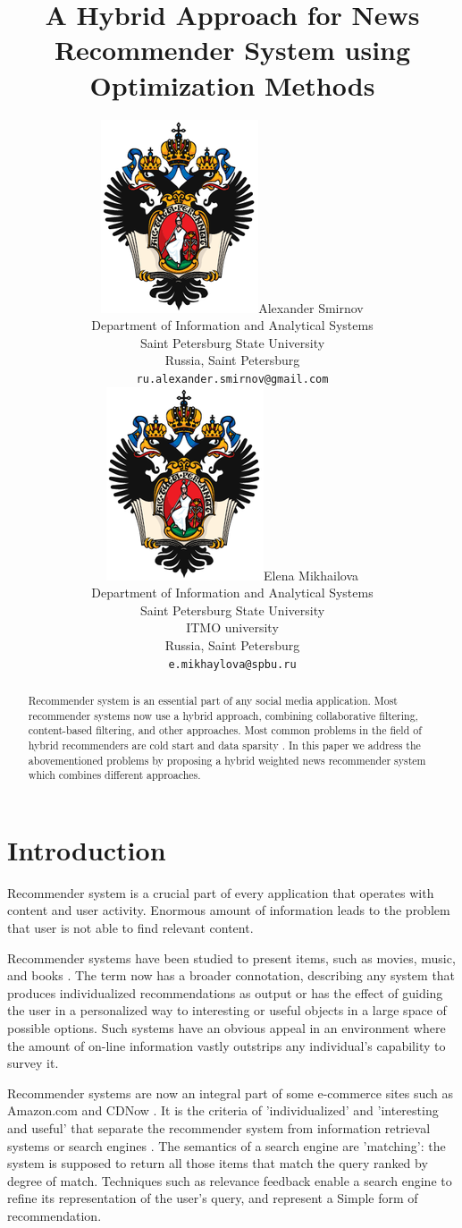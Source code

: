 \documentclass{article}
\title{A Hybrid Approach for News Recommender System using Optimization Methods}
\author{
    {\includegraphics[scale=0.07]{./images/spbu.png}\hspace{1mm}Alexander Smirnov}\\
	Department of Information and Analytical Systems\\
	Saint Petersburg State University\\
	Russia, Saint Petersburg\\
	\texttt{ru.alexander.smirnov@gmail.com} \\
	\And
	{\includegraphics[scale=0.07]{images/spbu.png}\hspace{1mm}Elena Mikhailova} \\
	Department of Information and Analytical Systems\\
	Saint Petersburg State University\\
    ITMO university\\
	Russia, Saint Petersburg\\
	\texttt{e.mikhaylova@spbu.ru} \\
}
\begin{document}
\maketitle

\begin{abstract}


    Recommender system is an essential part of any social media application. Most recommender systems now use a hybrid approach, combining collaborative filtering, content-based filtering, and other approaches. Most common problems in the field of hybrid recommenders are cold start and data sparsity \citep{overview}. In this paper we address the abovementioned problems by proposing a hybrid weighted news recommender system which combines different approaches.

\end{abstract}





\section{Introduction}




    Recommender system is a crucial part of every application that operates with content and user activity. Enormous amount of information leads to the problem that user is not able to find relevant content.

    Recommender systems have been studied to present items, such as movies, music, and books \citep{movies} \citep{films} \citep{books}. The term now has a broader connotation, describing any system that produces individualized recommendations as output or has the effect of guiding the user in a personalized way to interesting or useful objects in a large space of possible options. Such systems have an obvious appeal in an environment where the amount of on-line information vastly outstrips any individual’s capability to survey it.

    Recommender systems are now an integral part of some e-commerce sites such as Amazon.com and CDNow \citep{commerce}. It is the criteria of ’individualized’ and ’interesting and useful’ that separate the recommender system from information retrieval systems or search engines \citep{coin}. The semantics of a search engine are ’matching’: the system is supposed to return all those items that match the query ranked by degree of match.  Techniques such as relevance feedback enable a search engine to refine its representation of the user’s query, and represent a Simple form of recommendation.
\end{document}
